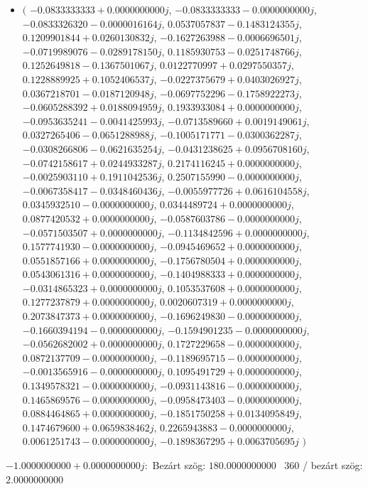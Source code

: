 \documentclass[14pt,a4paper]{article}
\begin{document}
\begin{itemize}
\item
$\big($
$-0.0833333333+0.0000000000j$, $-0.0833333333-0.0000000000j$, $-0.0833326320-0.0000016164j$, $0.0537057837-0.1483124355j$, $0.1209901844+0.0260130832j$, $-0.1627263988-0.0006696501j$, $-0.0719989076-0.0289178150j$, $0.1185930753-0.0251748766j$, $0.1252649818-0.1367501067j$, $0.0122770997+0.0297550357j$, $0.1228889925+0.1052406537j$, $-0.0227375679+0.0403026927j$, $0.0367218701-0.0187120948j$, $-0.0697752296-0.1758922273j$, $-0.0605288392+0.0188094959j$, $0.1933933084+0.0000000000j$, $-0.0953635241-0.0041425993j$, $-0.0713589660+0.0019149061j$, $0.0327265406-0.0651288988j$, $-0.1005171771-0.0300362287j$, $-0.0308266806-0.0621635254j$, $-0.0431238625+0.0956708160j$, $-0.0742158617+0.0244933287j$, $0.2174116245+0.0000000000j$, $-0.0025903110+0.1911042536j$, $0.2507155990-0.0000000000j$, $-0.0067358417-0.0348460436j$, $-0.0055977726+0.0616104558j$, $0.0345932510-0.0000000000j$, $0.0344489724+0.0000000000j$, $0.0877420532+0.0000000000j$, $-0.0587603786-0.0000000000j$, $-0.0571503507+0.0000000000j$, $-0.1134842596+0.0000000000j$, $0.1577741930-0.0000000000j$, $-0.0945469652+0.0000000000j$, $0.0551857166+0.0000000000j$, $-0.1756780504+0.0000000000j$, $0.0543061316+0.0000000000j$, $-0.1404988333+0.0000000000j$, $-0.0314865323+0.0000000000j$, $0.1053537608+0.0000000000j$, $0.1277237879+0.0000000000j$, $0.0020607319+0.0000000000j$, $0.2073847373+0.0000000000j$, $-0.1696249830-0.0000000000j$, $-0.1660394194-0.0000000000j$, $-0.1594901235-0.0000000000j$, $-0.0562682002+0.0000000000j$, $0.1727229658-0.0000000000j$, $0.0872137709-0.0000000000j$, $-0.1189695715-0.0000000000j$, $-0.0013565916-0.0000000000j$, $0.1095491729+0.0000000000j$, $0.1349578321-0.0000000000j$, $-0.0931143816-0.0000000000j$, $0.1465869576-0.0000000000j$, $-0.0958473403-0.0000000000j$, $0.0884464865+0.0000000000j$, $-0.1851750258+0.0134095849j$, $0.1474679600+0.0659838462j$, $0.2265943883-0.0000000000j$, $0.0061251743-0.0000000000j$, $-0.1898367295+0.0063705695j$
$\big)$
\end{itemize}
$-1.0000000000+0.0000000000j$:\
Bezárt szög: $180.0000000000$ \
360 / bezárt szög: $2.0000000000$\
\end{document}
